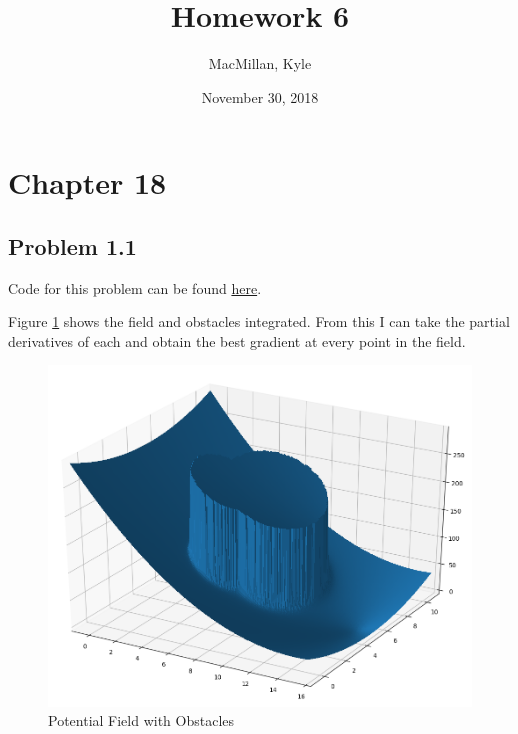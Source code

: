 \documentclass{article}
\title{\textbf{Homework 6}}
\author{MacMillan, Kyle}
\date{November 30, 2018}
\begin{document}
\maketitle

\newpage
\tableofcontents
{}
\newpage
\listoffigures
{}



\newpage
\hypersetup{
    colorlinks,
    citecolor=blue,
    filecolor=black,
    linkcolor=blue,
    urlcolor=blue
}

\setcounter{page}{1}
\newpage
\section{\textbf{Chapter 18}}
\subsection{Problem 1.1}
Code for this problem can be found 
\href{https://github.com/macattackftw/RoboticsHW/blob/master/HW6/problem18_1.py}{here}.

Figure \ref{fig:pot_field} shows the field and obstacles integrated. From this 
I can take the partial derivatives of each and obtain the best gradient at 
every point in the field.

\begin{figure}[h]
    \centering
    \includegraphics[scale=1]{field_obstacles}
    \caption{Potential Field with Obstacles}
    \label{fig:pot_field}
\end{figure}
\end{document}
